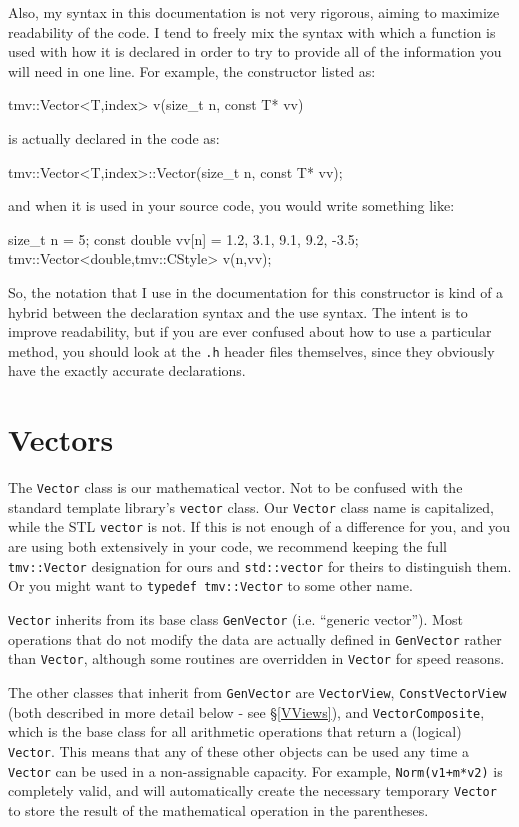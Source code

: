 \documentclass[twoside,letterpaper,11pt]{article}
\renewcommand{\tt}[1]{{\lstinline {#1}}}
\begin{document}
Also, my syntax in this documentation is not very rigorous, aiming to maximize
readability of the code.  
I tend to freely mix the syntax with which a function is used with how
it is declared in order to try to provide all of the information you will need in one line.  
For example, the constructor listed as:
\begin{tmvcode}
tmv::Vector<T,index> v(size_t n, const T* vv)
\end{tmvcode}
is actually declared in the code as:
\begin{tmvcode}
tmv::Vector<T,index>::Vector(size_t n, const T* vv);
\end{tmvcode}
and when it is used in your source code, you would write something like:
\begin{tmvcode}
size_t n = 5;
const double vv[n] = {1.2, 3.1, 9.1, 9.2, -3.5};
tmv::Vector<double,tmv::CStyle> v(n,vv);
\end{tmvcode}
So, the notation that I use in the documentation for this constructor is kind of a hybrid between the declaration syntax and the use syntax.  The intent is to improve readability, but
if you are ever confused about how to use a particular method, you should look at
the \tt{.h} header files themselves, since they obviously have the exactly accurate
declarations.  

\newpage
\section{Vectors}

The \tt{Vector} class is our mathematical vector.  Not to be confused with
the standard template library's \tt{vector} class.  
Our \tt{Vector} class name is capitalized, while the STL \tt{vector} is not.
If this is not enough of a difference for you, and you are using both extensively in your code,
we recommend keeping the full \tt{tmv::Vector} designation for ours and \tt{std::vector}
for theirs to distinguish them.  Or you might want to \tt{typedef tmv::Vector} to some other name.

\tt{Vector} inherits from its base class \tt{GenVector} (i.e. ``generic vector'').
Most operations that do not 
modify the data are actually defined in \tt{GenVector} rather than \tt{Vector}, although
some routines are overridden in \tt{Vector} for speed reasons.  

The other classes that inherit from \tt{GenVector} are \tt{VectorView}, 
\tt{ConstVectorView} (both described in more detail below - see \S\ref{VViews}), and
\tt{VectorComposite}, which is the base class for all arithmetic operations that
return a (logical) \tt{Vector}.  This means that any of these other objects can be used
any time a \tt{Vector} can be used in a non-assignable capacity.  For example,
\tt{Norm(v1+m*v2)} is completely valid, and will automatically create the necessary
temporary \tt{Vector} to store the result of the mathematical operation in the parentheses.
\end{document}
